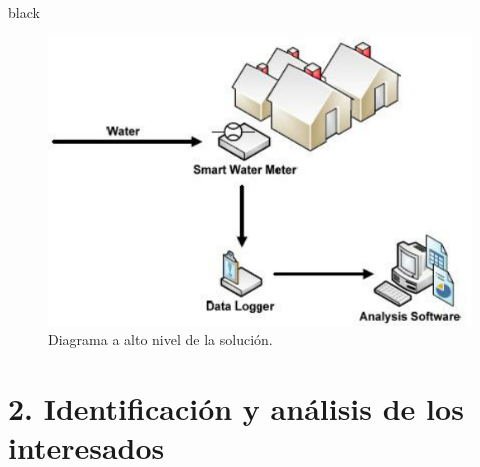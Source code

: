\documentclass[
11pt, %
codirector, %
]{charter}
\begin{document}
\begin{consigna}{black}
\begin{figure}[htpb]
\centering 
\includegraphics[width=.8\textwidth]{./Figuras/diagHLSolucion.png} 
\caption{Diagrama a alto nivel de la solución.}
\label{fig:diagHLSolucion}
\end{figure}

\vspace{25px}

\end{consigna}


\section{2. Identificación y análisis de los interesados}
\label{sec:interesados}
\end{document}
